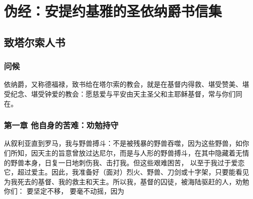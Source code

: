
\chapter{伪经：安提约基雅的圣依纳爵书信集}



\section{致塔尔索人书}


\subsection{问候}

依纳爵，又称德福禄，致书给在塔尔索的教会，就是在基督内得救、堪受赞美、堪受纪念、堪受钟爱的教会：愿慈爱与平安由天主圣父和主耶稣基督，常与你们同在。\par


\subsection{第一章 他自身的苦难：劝勉持守}

从叙利亚直到罗马，我与野兽搏斗：不是被残暴的野兽吞噬，因为这些野兽，如你们所知，因天主的旨意曾放过达尼尔，而是与人形的野兽搏斗，在其中隐藏着无情的野兽本身，日复一日地刺伤我、击打我。但这些艰难困苦， 以至于我过于爱恋它，超过爱主。因此，我准备好（面对）烈火、野兽、刀剑或十字架，只要能看见为我死去的基督、我的救主和天主。所以我，基督的囚徒，被海陆驱赶的人，劝勉你们： 要坚定不移， 要毫不动摇，因为\par


